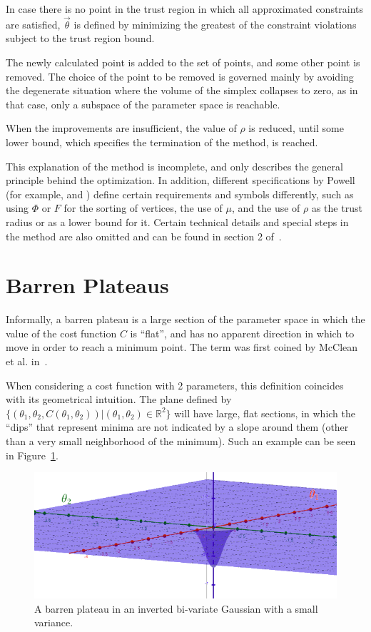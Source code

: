 \documentclass[a4paper,12pt]{article}
\newcommand{\thetas}{\vec{\theta}}
\begin{document}
In case there is no point in the trust region in which all approximated constraints are satisfied, $\thetas$ is defined by minimizing the greatest of the constraint violations subject to the trust region bound.

The newly calculated point is added to the set of points, and some other point is removed.
The choice of the point to be removed is governed mainly by avoiding the degenerate situation where the volume of the simplex collapses to zero, as in that case, only a subspace of the parameter space is reachable.

When the improvements are insufficient, the value of $\rho$ is reduced, until some lower bound, which specifies the termination of the method, is reached.

This explanation of the method is incomplete, and only describes the general principle behind the optimization. In addition, different specifications by Powell (for example, \cite{Powell1994} and \cite{powell_view_2007}) define certain requirements and symbols differently, such as using $\Phi$ or $F$ for the sorting of vertices, the use of $\mu$, and the use of $\rho$ as the trust radius or as a lower bound for it.
Certain technical details and special steps in the method are also omitted and can be found in section 2 of~\cite{Powell1994}.


\section{Barren Plateaus} \label{sec:bps}
Informally, a barren plateau is a large section of the parameter space in which the value of the cost function $C$ is ``flat'', and has no apparent direction in which to move in order to reach a minimum point. The term was first coined by McClean et al. in~\cite{mcclean_barren_2018}.

When considering a cost function with 2 parameters, this definition coincides with its geometrical intuition. The plane defined by $\{(\theta_1, \theta_2, C(\theta_1, \theta_2)) | (\theta_1, \theta_2) \in \mathbb{R}^2\}$ will have large, flat sections, in which the ``dips'' that represent minima are not indicated by a slope around them (other than a very small neighborhood of the minimum). Such an example can be seen in Figure~\ref{fig:bp}.

\begin{figure}[h]
    \centering
    \captionsetup{justification=centering, margin=0.5cm}
    \includegraphics[scale=0.5]{bp_3d.png}
    \caption{A barren plateau in an inverted bi-variate Gaussian with a small variance.}
    \label{fig:bp}
\end{figure}
\end{document}
